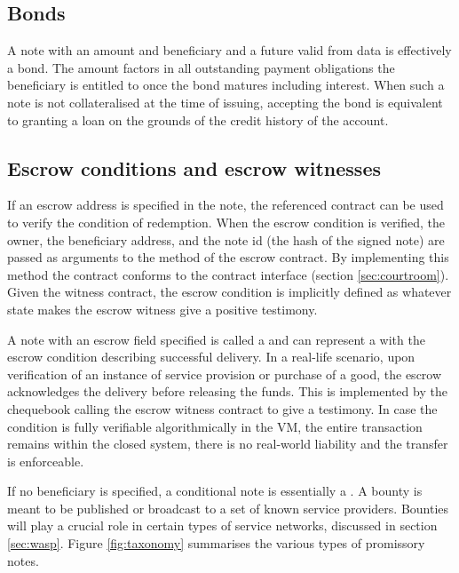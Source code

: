 \subsection{Bonds}

A note with an amount and beneficiary and a future valid from data is effectively a bond. The amount factors in all outstanding payment obligations the beneficiary is entitled to once the bond matures including interest. When such a note is not collateralised at the time of issuing, accepting the bond is equivalent to granting a loan on the grounds of the credit history of the account. 
\subsection{Escrow conditions and escrow witnesses}

If an escrow address is specified in the note, the referenced contract can be used to verify the condition of redemption. When the escrow condition is verified, the owner, the beneficiary address, and the note id (the hash of the signed note) are passed as arguments to the {} method of the escrow contract. By implementing this method the contract conforms to the  contract  interface (section \ref{sec:courtroom}). Given the witness contract, the escrow condition is implicitly defined as whatever state makes the escrow witness give a positive testimony. 

A note with an escrow field specified is called a  and can represent a  with the escrow condition describing successful delivery. In a real-life scenario, upon verification of an instance of service provision or purchase of a good, the escrow acknowledges the delivery before releasing the funds. This is implemented by the chequebook calling the escrow witness contract to give a testimony. In case the condition is fully verifiable algorithmically in the VM, the entire transaction remains within the closed system, there is no real-world liability and the transfer is enforceable.

If no beneficiary is specified, a conditional note is essentially a . A bounty is meant to be published or broadcast to a set of known service providers. Bounties will play a crucial role in certain types of service networks, discussed in section \ref{sec:wasp}. Figure \ref{fig:taxonomy} summarises the various types of promissory notes.


